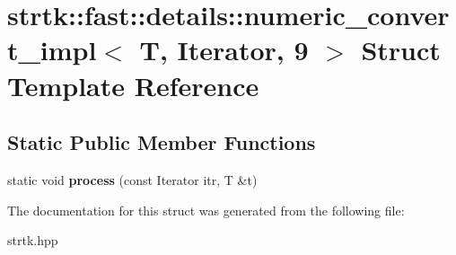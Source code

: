 \hypertarget{structstrtk_1_1fast_1_1details_1_1numeric__convert__impl_3_01T_00_01Iterator_00_019_01_4}{\section{strtk\-:\-:fast\-:\-:details\-:\-:numeric\-\_\-convert\-\_\-impl$<$ T, Iterator, 9 $>$ Struct Template Reference}
\label{structstrtk_1_1fast_1_1details_1_1numeric__convert__impl_3_01T_00_01Iterator_00_019_01_4}
}
\subsection*{Static Public Member Functions}
\begin{DoxyCompactItemize}
\item 
\hypertarget{structstrtk_1_1fast_1_1details_1_1numeric__convert__impl_3_01T_00_01Iterator_00_019_01_4_a9ce46fd1b8b5f1f472f78a36435bed51}{static void {\bfseries process} (const Iterator itr, T \&t)}\label{structstrtk_1_1fast_1_1details_1_1numeric__convert__impl_3_01T_00_01Iterator_00_019_01_4_a9ce46fd1b8b5f1f472f78a36435bed51}

\end{DoxyCompactItemize}


The documentation for this struct was generated from the following file\-:\begin{DoxyCompactItemize}
\item 
strtk.\-hpp\end{DoxyCompactItemize}

